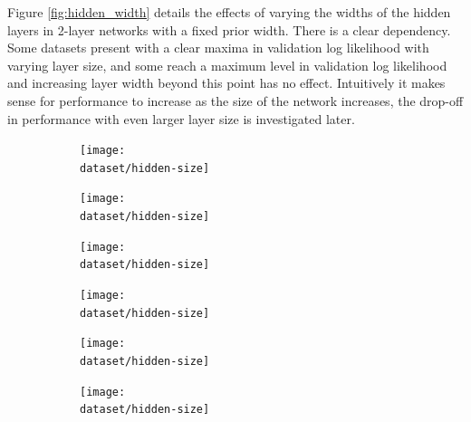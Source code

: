 Figure \ref{fig:hidden_width} details the effects of varying the widths of the hidden layers in 2-layer networks with a fixed prior width. There is a clear dependency. Some datasets present with a clear maxima in validation log likelihood with varying layer size, and some reach a maximum level in validation log likelihood and increasing layer width beyond this point has no effect. Intuitively it makes sense for performance to increase as the size of the network increases, the drop-off in performance with even larger layer size is investigated later.

\begin{figure}[p]
	\def\dataset{\bostonvar}
	\def\dataname{\bostonname}
	\begin{subfigure}{0.48\textwidth}
		\texttt{[image: \\dataset/hidden-size]}
		\caption{\dataname}
		\label{fig:hidden_width_\dataset}
	\end{subfigure}
	\def\dataset{\concretevar}
	\def\dataname{\concretename}
	\begin{subfigure}{0.48\textwidth}
		\texttt{[image: \\dataset/hidden-size]}
		\caption{\dataname}
		\label{fig:hidden_width_\dataset}
	\end{subfigure}
	
	\def\dataset{\energyvar}
	\def\dataname{\energyname}
	\begin{subfigure}{0.48\textwidth}
		\texttt{[image: \\dataset/hidden-size]}
		\caption{\dataname}
		\label{fig:hidden_width_\dataset}
	\end{subfigure}
	\def\dataset{\kinvar}
	\def\dataname{\kinname}
	\begin{subfigure}{0.48\textwidth}
		\texttt{[image: \\dataset/hidden-size]}
		\caption{\dataname}
		\label{fig:hidden_width_\dataset}
	\end{subfigure}

	\def\dataset{\powervar}
	\def\dataname{\powername}
	\begin{subfigure}{0.48\textwidth}
		\texttt{[image: \\dataset/hidden-size]}
		\caption{\dataname}
		\label{fig:hidden_width_\dataset}
	\end{subfigure}
	\def\dataset{\proteinvar}
	\def\dataname{\proteinname}
	\begin{subfigure}{0.48\textwidth}
		\texttt{[image: \\dataset/hidden-size]}
		\caption{\dataname}
		\label{fig:pruning_\dataset}
	\end{subfigure}
	

\end{figure}
